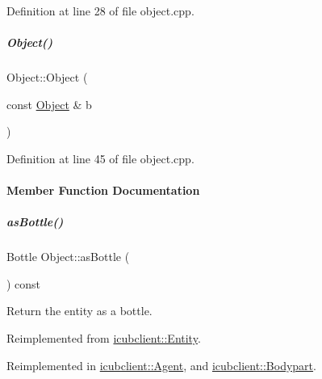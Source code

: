 Definition at line 28 of file object.\+cpp.

\mbox{\label{group__icubclient__representations_a770d7836e04c192a8207168888bf7889}} 
\subparagraph{\texorpdfstring{Object()}{Object()}\hspace{0.1cm}{\footnotesize\ttfamily [2/2]}}
{\footnotesize\ttfamily Object\+::\+Object (\begin{DoxyParamCaption}\item[{const \hyperlink{group__icubclient__representations_classicubclient_1_1Object}{Object} \&}]{b }\end{DoxyParamCaption})}



Definition at line 45 of file object.\+cpp.



\paragraph{Member Function Documentation}
\mbox{\label{group__icubclient__representations_a60acd95fa583dc758f2b76e1968a7ea2}} 
\subparagraph{\texorpdfstring{as\+Bottle()}{asBottle()}}
{\footnotesize\ttfamily Bottle Object\+::as\+Bottle (\begin{DoxyParamCaption}{ }\end{DoxyParamCaption}) const\hspace{0.3cm}{\ttfamily [virtual]}}



Return the entity as a bottle. 



Reimplemented from \hyperlink{group__icubclient__representations_a1481200655f5b88c81a9fa19941fd841}{icubclient\+::\+Entity}.



Reimplemented in \hyperlink{group__icubclient__representations_a7969e73f3ee81ba44e36211807666033}{icubclient\+::\+Agent}, and \hyperlink{group__icubclient__representations_acacf4d8971e54092fae9f3278f219562}{icubclient\+::\+Bodypart}.



